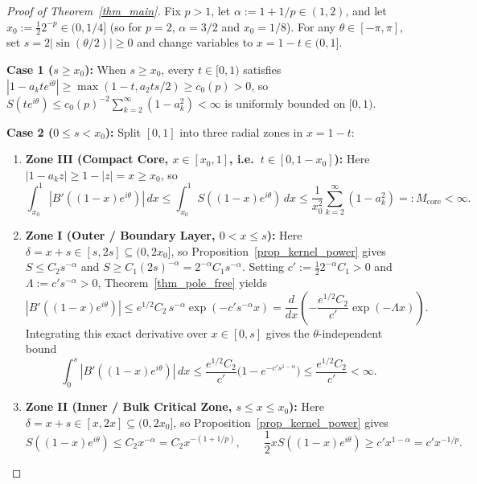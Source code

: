 \documentclass[11pt,reqno]{amsart}
\numberwithin{equation}{section}
\begin{document}
\begin{proof}[Proof of Theorem~\ref{thm_main}]
Fix $p > 1$, let $\alpha := 1 + 1/p \in (1, 2)$, and let $x_0 := \frac{1}{2} 2^{-p} \in (0, 1/4]$ (so for $p = 2$, $\alpha = 3/2$ and $x_0 = 1/8$). For any $\theta \in [-\pi, \pi]$, set $s = 2|\sin(\theta/2)| \ge 0$ and change variables to $x = 1 - t \in (0, 1]$.

\smallskip\noindent
\textbf{Case 1 ($s \ge x_0$):} When $s \ge x_0$, every $t \in [0, 1)$ satisfies $|1 - a_k t e^{i\theta}| \ge \max(1 - t, a_2 t s / 2) \ge c_0(p) > 0$, so $S(t e^{i\theta}) \le c_0(p)^{-2} \sum_{k=2}^\infty (1 - a_k^2) < \infty$ is uniformly bounded on $[0, 1)$.

\smallskip\noindent
\textbf{Case 2 ($0 \le s < x_0$):} Split $[0, 1]$ into three radial zones in $x = 1 - t$:
\begin{enumerate}
\item \textbf{Zone III (Compact Core, $x \in [x_0, 1]$, i.e.\ $t \in [0, 1 - x_0]$):} Here $|1 - a_k z| \ge 1 - |z| = x \ge x_0$, so
\begin{equation} \label{eq_zone_III}
  \int_{x_0}^1 |B'((1-x)e^{i\theta})|\,dx \le \int_{x_0}^1 S((1-x)e^{i\theta})\,dx \le \frac{1}{x_0^2} \sum_{k=2}^\infty (1 - a_k^2) =: M_{\mathrm{core}} < \infty.
\end{equation}
\item \textbf{Zone I (Outer / Boundary Layer, $0 < x \le s$):} Here $\delta = x + s \in [s, 2s] \subseteq (0, 2x_0]$, so Proposition~\ref{prop_kernel_power} gives $S \le C_2 s^{-\alpha}$ and $S \ge C_1 (2s)^{-\alpha} = 2^{-\alpha} C_1 s^{-\alpha}$. Setting $c' := \frac{1}{2} 2^{-\alpha} C_1 > 0$ and $\Lambda := c' s^{-\alpha} > 0$, Theorem~\ref{thm_pole_free} yields
\[
  |B'((1-x)e^{i\theta})| \le e^{1/2} C_2 \, s^{-\alpha} \exp\!\left(-c' s^{-\alpha} x\right) = \frac{d}{dx}\!\left( -\frac{e^{1/2} C_2}{c'} \exp(-\Lambda x) \right).
\]
Integrating this exact derivative over $x \in [0, s]$ gives the $\theta$-independent bound
\begin{equation} \label{eq_zone_I}
  \int_0^s |B'((1-x)e^{i\theta})|\,dx \le \frac{e^{1/2} C_2}{c'}\bigl(1 - e^{-c' s^{1-\alpha}}\bigr) \le \frac{e^{1/2} C_2}{c'} < \infty.
\end{equation}
\item \textbf{Zone II (Inner / Bulk Critical Zone, $s \le x \le x_0$):} Here $\delta = x + s \in [x, 2x] \subseteq (0, 2x_0]$, so Proposition~\ref{prop_kernel_power} gives
\[
  S((1-x)e^{i\theta}) \le C_2 x^{-\alpha} = C_2 x^{-(1 + 1/p)}, \qquad
  \frac{1}{2} x S((1-x)e^{i\theta}) \ge c' x^{1 - \alpha} = c' x^{-1/p}.
\]
\end{enumerate}
\end{proof}
\end{document}

